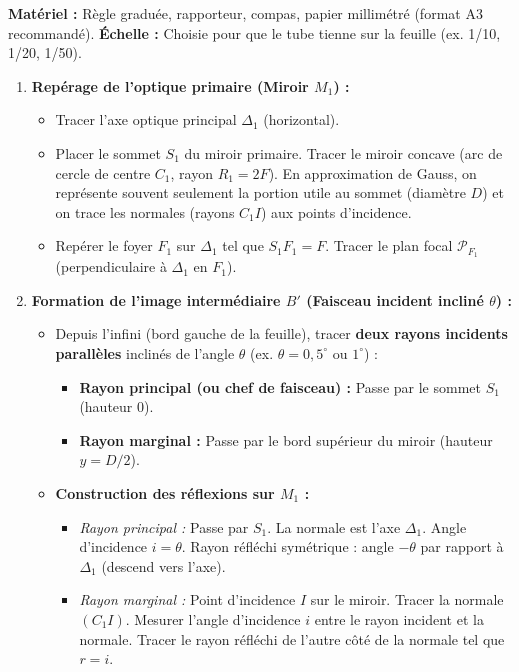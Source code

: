 \documentclass[11pt]{article}
\begin{document}
\begin{methode}
\textbf{Matériel :} Règle graduée, rapporteur, compas, papier millimétré (format A3 recommandé). \textbf{Échelle :} Choisie pour que le tube tienne sur la feuille (ex. 1/10, 1/20, 1/50).
\begin{enumerate}
    \item \textbf{Repérage de l'optique primaire (Miroir $M_1$) :}
        \begin{itemize}
            \item Tracer l'axe optique principal $\Delta_1$ (horizontal).
            \item Placer le sommet $S_1$ du miroir primaire. Tracer le miroir concave (arc de cercle de centre $C_1$, rayon $R_1 = 2F$). En approximation de Gauss, on représente souvent seulement la portion utile au sommet (diamètre $D$) et on trace les normales (rayons $C_1I$) aux points d'incidence.
            \item Repérer le foyer $F_1$ sur $\Delta_1$ tel que $S_1F_1 = F$. Tracer le plan focal $\mathcal{P}_{F_1}$ (perpendiculaire à $\Delta_1$ en $F_1$).
        \end{itemize}
    \item \textbf{Formation de l'image intermédiaire $B'$ (Faisceau incident incliné $\theta$) :}
        \begin{itemize}
            \item Depuis l'infini (bord gauche de la feuille), tracer \textbf{deux rayons incidents parallèles} inclinés de l'angle $\theta$ (ex. $\theta = 0,5^\circ$ ou $1^\circ$) : 
                \begin{itemize}
                    \item \textbf{Rayon principal (ou chef de faisceau) :} Passe par le sommet $S_1$ (hauteur 0).
                    \item \textbf{Rayon marginal :} Passe par le bord supérieur du miroir (hauteur $y = D/2$).
                \end{itemize}
            \item \textbf{Construction des réflexions sur $M_1$ :}
                \begin{itemize}
                    \item \textit{Rayon principal :} Passe par $S_1$. La normale est l'axe $\Delta_1$. Angle d'incidence $i = \theta$. Rayon réfléchi symétrique : angle $-\theta$ par rapport à $\Delta_1$ (descend vers l'axe).
                    \item \textit{Rayon marginal :} Point d'incidence $I$ sur le miroir. Tracer la normale $(C_1I)$. Mesurer l'angle d'incidence $i$ entre le rayon incident et la normale. Tracer le rayon réfléchi de l'autre côté de la normale tel que $r = i$.

\end{itemize}
\end{itemize}
\end{enumerate}
\end{methode}
\end{document}
